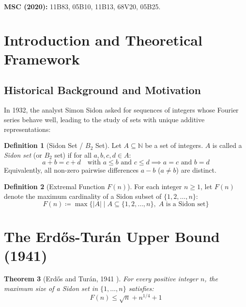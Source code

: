 \documentclass[11pt,a4paper]{article}
\newtheorem{theorem}{Theorem}[section]
\theoremstyle{definition}
\newtheorem{definition}[theorem]{Definition}
\begin{document}
\noindent\textbf{MSC (2020):} 11B83, 05B10, 11B13, 68V20, 05B25.

\tableofcontents
\newpage

\section{Introduction and Theoretical Framework}

\subsection{Historical Background and Motivation}
In 1932, the analyst Simon Sidon asked for sequences of integers whose Fourier series behave well, leading to the study of sets with unique additive representations:

\begin{definition}[Sidon Set / $B_2$ Set]\label{def:sidon_set}
Let $A \subseteq \mathbb{N}$ be a set of integers.
$A$ is called a \emph{Sidon set} (or $B_2$ set) if for all $a, b, c, d \in A$:
\begin{equation}\label{eq:sidon_def}
a + b = c + d \quad \text{with } a \le b \text{ and } c \le d \implies a = c \text{ and } b = d
\end{equation}
Equivalently, all non-zero pairwise differences $a - b$ ($a \ne b$) are distinct.
\end{definition}

\begin{definition}[Extremal Function $F(n)$]\label{def:fn_sidon}
For each integer $n \ge 1$, let $F(n)$ denote the maximum cardinality of a Sidon subset of $\{1, 2, \dots, n\}$:
\begin{equation}\label{eq:sidon_max}
F(n) \coloneqq \max \{ |A| \mid A \subseteq \{1, 2, \dots, n\}, \; A \text{ is a Sidon set} \}
\end{equation}
\end{definition}

\section{The Erd\H{o}s-Tur\'an Upper Bound (1941)}

\begin{theorem}[Erd\H{o}s and Tur\'an, 1941 \cite{erdos_turan1941}]\label{thm:erdos_turan_sidon}
For every positive integer $n$, the maximum size of a Sidon set in $\{1, \dots, n\}$ satisfies:
\begin{equation}\label{eq:erdos_turan_bound}
F(n) \le \sqrt{n} + n^{1/4} + 1
\end{equation}
\end{theorem}
\end{document}
